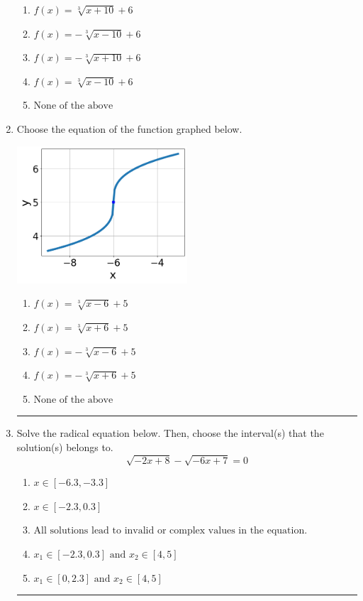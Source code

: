 \documentclass[14pt]{extbook}
\newcommand{\litem}[1]{\item#1\hspace*{-1cm}\rule{\textwidth}{0.4pt}}
\begin{document}
\begin{enumerate}
{\begin{center}
\end{center}
\begin{enumerate}[label=\Alph*.]
\item \( f(x) = \sqrt[3]{x + 10} + 6 \)
\item \( f(x) = - \sqrt[3]{x - 10} + 6 \)
\item \( f(x) = - \sqrt[3]{x + 10} + 6 \)
\item \( f(x) = \sqrt[3]{x - 10} + 6 \)
\item \( \text{None of the above} \)

\end{enumerate} }
\litem{
Choose the equation of the function graphed below.
\begin{center}
    \includegraphics[width=0.5\textwidth]{../Figures/radicalGraphToEquationCopyC.png}
\end{center}
\begin{enumerate}[label=\Alph*.]
\item \( f(x) = \sqrt[3]{x - 6} + 5 \)
\item \( f(x) = \sqrt[3]{x + 6} + 5 \)
\item \( f(x) = - \sqrt[3]{x - 6} + 5 \)
\item \( f(x) = - \sqrt[3]{x + 6} + 5 \)
\item \( \text{None of the above} \)

\end{enumerate} }
\litem{
Solve the radical equation below. Then, choose the interval(s) that the solution(s) belongs to.\[ \sqrt{-2 x + 8} - \sqrt{-6 x + 7} = 0 \]\begin{enumerate}[label=\Alph*.]
\item \( x \in [-6.3,-3.3] \)
\item \( x \in [-2.3,0.3] \)
\item \( \text{All solutions lead to invalid or complex values in the equation.} \)
\item \( x_1 \in [-2.3, 0.3] \text{ and } x_2 \in [4,5] \)
\item \( x_1 \in [0, 2.3] \text{ and } x_2 \in [4,5] \)


\end{enumerate}}
\end{enumerate}
\end{document}
